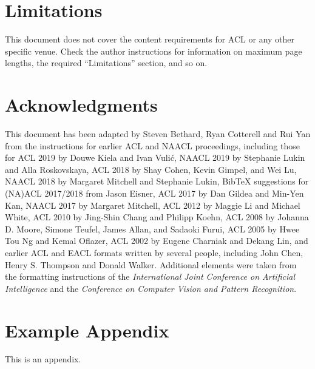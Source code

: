 \documentclass[11pt]{article}
\begin{document}
\section*{Limitations}

This document does not cover the content requirements for ACL or any
other specific venue.  Check the author instructions for
information on
maximum page lengths, the required ``Limitations'' section,
and so on.

\section*{Acknowledgments}

This document has been adapted
by Steven Bethard, Ryan Cotterell and Rui Yan
from the instructions for earlier ACL and NAACL proceedings, including those for
ACL 2019 by Douwe Kiela and Ivan Vuli\'{c},
NAACL 2019 by Stephanie Lukin and Alla Roskovskaya,
ACL 2018 by Shay Cohen, Kevin Gimpel, and Wei Lu,
NAACL 2018 by Margaret Mitchell and Stephanie Lukin,
Bib\TeX{} suggestions for (NA)ACL 2017/2018 from Jason Eisner,
ACL 2017 by Dan Gildea and Min-Yen Kan,
NAACL 2017 by Margaret Mitchell,
ACL 2012 by Maggie Li and Michael White,
ACL 2010 by Jing-Shin Chang and Philipp Koehn,
ACL 2008 by Johanna D. Moore, Simone Teufel, James Allan, and Sadaoki Furui,
ACL 2005 by Hwee Tou Ng and Kemal Oflazer,
ACL 2002 by Eugene Charniak and Dekang Lin,
and earlier ACL and EACL formats written by several people, including
John Chen, Henry S. Thompson and Donald Walker.
Additional elements were taken from the formatting instructions of the \emph{International Joint Conference on Artificial Intelligence} and the \emph{Conference on Computer Vision and Pattern Recognition}.

%


\appendix

\section{Example Appendix}
\label{sec:appendix}

This is an appendix.
\end{document}
